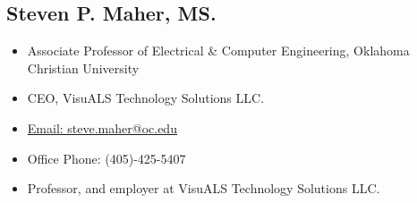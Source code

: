 \documentclass{article}
\begin{document}
\begin{spacing}{.5}
	\subsection{Steven P. Maher, MS.}
		\begin{itemize}[label=--,itemsep=-.35ex]
			\item \large{Associate Professor of Electrical \& Computer Engineering, Oklahoma Christian University}
			\item \large{CEO, VisuALS Technology Solutions LLC.}
			\item \large{\href{mailto::steve.maher@oc.edu}{\large{Email: steve.maher@oc.edu}}}
			\item \large{Office Phone: (405)-425-5407}
			\item \large{Professor, and employer at VisuALS Technology Solutions LLC.}
		\end{itemize}

\end{spacing}
\end{document}
